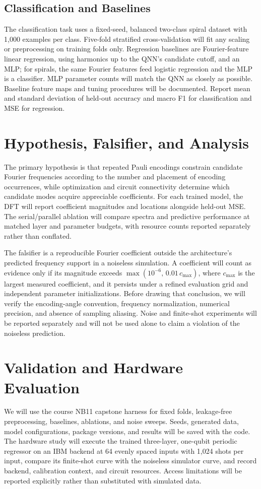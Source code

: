 \documentclass[conference]{IEEEtran}
\begin{document}
\subsection{Classification and Baselines}
The classification task uses a fixed-seed, balanced two-class spiral dataset
with 1,000 examples per class. Five-fold stratified cross-validation will fit
any scaling or preprocessing on training folds only. Regression baselines
are Fourier-feature linear regression, using harmonics up to the QNN's
candidate cutoff, and an MLP; for spirals, the same Fourier features feed
logistic regression and the MLP is a classifier. MLP parameter counts will
match the QNN as closely as possible. Baseline feature maps and tuning
procedures will be documented. Report mean and standard deviation of
held-out accuracy and macro F1 for classification and MSE for regression.

\section{Hypothesis, Falsifier, and Analysis}
The primary hypothesis is that repeated Pauli encodings constrain candidate
Fourier frequencies according to the number and placement of encoding
occurrences, while optimization and circuit connectivity determine which
candidate modes acquire appreciable coefficients. For each trained model,
the DFT will report coefficient magnitudes and locations alongside held-out
MSE. The serial/parallel ablation will compare spectra and predictive
performance at matched layer and parameter budgets, with resource counts
reported separately rather than conflated.

The falsifier is a reproducible Fourier coefficient outside the
architecture's predicted frequency support in a noiseless simulation. A
coefficient will count as evidence only if its magnitude exceeds
$\max(10^{-6},\,0.01\,c_{\max})$, where $c_{\max}$ is the largest measured
coefficient, and it persists under a refined evaluation grid and independent
parameter initializations. Before drawing that conclusion, we will verify
the encoding-angle convention, frequency normalization, numerical precision,
and absence of sampling aliasing. Noise and finite-shot experiments will be
reported separately and will not be used alone to claim a violation of the
noiseless prediction.

\section{Validation and Hardware Evaluation}
We will use the course NB11 capstone harness for fixed folds, leakage-free
preprocessing, baselines, ablations, and noise sweeps. Seeds, generated data,
model configurations, package versions, and results will be saved with the
code. The hardware study will execute the trained three-layer, one-qubit periodic
regressor on an IBM backend at 64 evenly spaced inputs with 1,024 shots per
input, compare its finite-shot curve with the noiseless simulator curve, and
record backend, calibration context, and circuit resources. Access
limitations will be reported explicitly rather than substituted with
simulated data.
\end{document}
